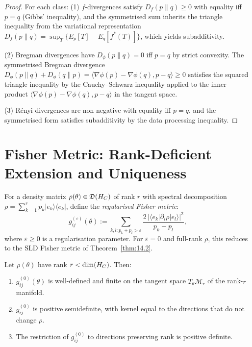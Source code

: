 \begin{proof}
For each class:
(1) $f$-divergences satisfy $D_f(p \| q) \geq 0$ with equality iff
$p = q$ (Gibbs' inequality), and the symmetrised sum inherits the
triangle inequality from the variational representation
$D_f(p \| q) = \sup_T \{E_p[T] - E_q[f^*(T)]\}$, which yields
subadditivity.

(2) Bregman divergences have $D_\phi(p \| q) = 0$ iff $p = q$ by strict
convexity.  The symmetrised Bregman divergence
$D_\phi(p \| q) + D_\phi(q \| p) =
\langle \nabla\phi(p) - \nabla\phi(q), p - q \rangle \geq 0$
satisfies the squared triangle inequality by the Cauchy--Schwarz inequality
applied to the inner product $\langle \nabla\phi(p) - \nabla\phi(q),
p - q \rangle$ in the tangent space.

(3) R\'enyi divergences are non-negative with equality iff $p = q$, and
the symmetrised form satisfies subadditivity by the data processing
inequality.
\end{proof}

\section{Fisher Metric: Rank-Deficient Extension and Uniqueness}
\label{sec:ch15:fisher}

\begin{definition}\label{def:15.3}
For a density matrix $\rho(\theta) \in \mathfrak{D}(H_C)$ of rank $r$
with spectral decomposition $\rho = \sum_{k=1}^r p_k |e_k\rangle
\langle e_k|$, define the \emph{regularised Fisher metric}:
\begin{equation}\label{eq:reg-fisher}
  g_{ij}^{(\varepsilon)}(\theta) :=
  \sum_{k,l: p_k + p_l > \varepsilon}
  \frac{2\,|\langle e_k|\partial_i\rho|e_l\rangle|^2}{p_k + p_l},
\end{equation}
where $\varepsilon \geq 0$ is a regularisation parameter.  For
$\varepsilon = 0$ and full-rank $\rho$, this reduces to the SLD
Fisher metric of Theorem~\ref{thm:14.2}.
\end{definition}

\begin{theorem}\label{thm:15.2}
Let $\rho(\theta)$ have rank $r < \dim(H_C)$.  Then:
\begin{enumerate}
  \item $g_{ij}^{(0)}(\theta)$ is well-defined and finite on the tangent
        space $T_\theta \mathcal{M}_r$ of the rank-$r$ manifold.
  \item $g_{ij}^{(0)}$ is positive semidefinite, with kernel equal to
        the directions that do not change $\rho$.
  \item The restriction of $g_{ij}^{(0)}$ to directions preserving rank
        is positive definite.
\end{enumerate}
\end{theorem}

